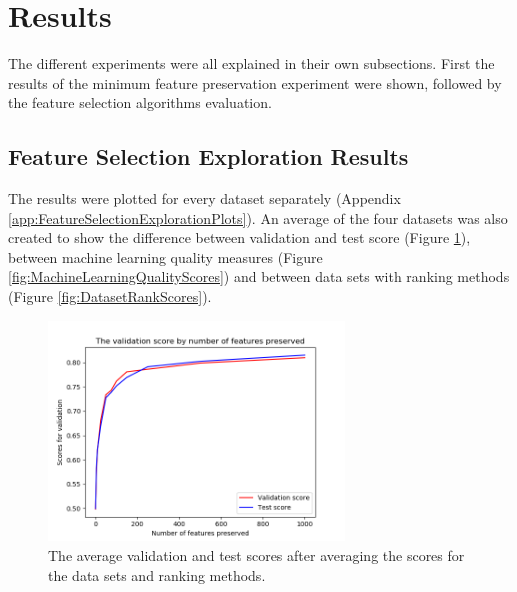 \documentclass[10pt,a4paper]{article}
\begin{document}
	
	\section{Results}
	\label{sec:Results}
	
	The different experiments were all explained in their own subsections. First the results of the minimum feature preservation experiment were shown, followed by the feature selection algorithms evaluation.
	
	\subsection{Feature Selection Exploration Results}
	\label{subsec:FeatureReductionExplorationResults}
	
	The results were plotted for every dataset separately (Appendix \ref{app:FeatureSelectionExplorationPlots}). An average of the four datasets was also created to show the difference between validation and test score (Figure \ref{fig:ValTestScores}), between machine learning quality measures (Figure \ref{fig:MachineLearningQualityScores}) and between data sets with ranking methods (Figure \ref{fig:DatasetRankScores}).
	
	\begin{figure}[H]
		\includegraphics[width=0.7\textwidth]{Val_Test_Scores.png}
		\caption{The average validation and test scores after averaging the scores for the data sets and ranking methods.}
		\label{fig:ValTestScores}
	\end{figure}
	
\end{document}
